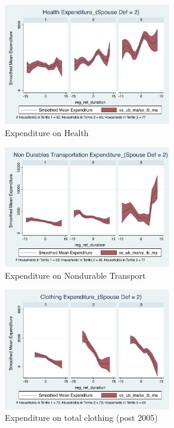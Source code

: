 \documentclass[11pt,onecolumn]{article}
\numberwithin{figure}{section}
\begin{document}
\begin{figure}[h]
	\caption{Expenditure on Health}
	\centering
	\includegraphics[width=0.65\textwidth]{../ConsumptionPostRetirement_by_SpouseDef_Cats/Smoothed/2/spouse_def_total_healthexpense_real.pdf}
\end{figure}


\begin{figure}[h]
	\caption{Expenditure on Nondurable Transport}
	\centering
	\includegraphics[width=0.65\textwidth]{../ConsumptionPostRetirement_by_SpouseDef_Cats/Smoothed/2/spouse_def_total_transport_real.pdf}
\end{figure}
\clearpage

\begin{figure}[h]
	\caption{Expenditure on total clothing (post 2005)}
	\centering
	\includegraphics[width=0.65\textwidth]{../ConsumptionPostRetirement_by_SpouseDef_Cats/Smoothed/2/spouse_def_total_clothing_2005_real.pdf}
\end{figure}
\end{document}
